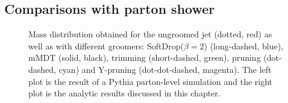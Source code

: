 \subsection{Comparisons with parton shower}\label{sec:calc-groomed-mass-ps}

\begin{figure}[t!]
  \hfill%
  \caption{Mass distribution obtained for the ungroomed jet (dotted,
    red) as well as with different groomers: SoftDrop($\beta=2$)
    (long-dashed, blue), mMDT (solid, black), trimming (short-dashed,
    green), pruning (dot-dashed, cyan) and Y-pruning (dot-dot-dashed,
    magenta). The left plot is the result of a Pythia parton-level
    simulation and the right plot is the analytic results discussed in
    this chapter.}\label{fig:groomers-pythia-v-analytic}
\end{figure}



